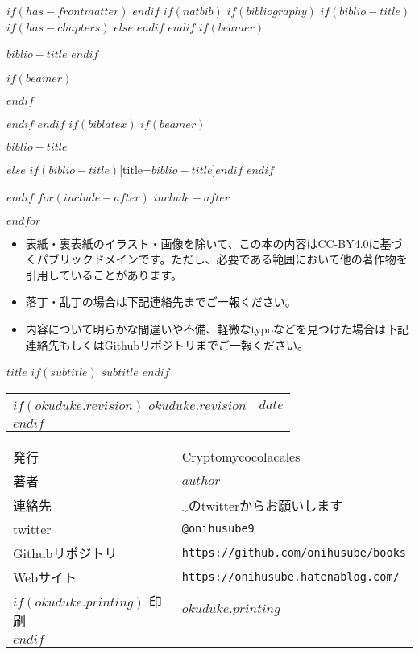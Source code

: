 $if(has-frontmatter)$
\backmatter
$endif$
$if(natbib)$
$if(bibliography)$
$if(biblio-title)$
$if(has-chapters)$
\renewcommand\bibname{$biblio-title$}
$else$
\renewcommand\refname{$biblio-title$}
$endif$
$endif$
$if(beamer)$
\begin{frame}[allowframebreaks]{$biblio-title$}
  \bibliographytrue
$endif$
  
$if(beamer)$
\end{frame}
$endif$

$endif$
$endif$
$if(biblatex)$
$if(beamer)$
\begin{frame}[allowframebreaks]{$biblio-title$}
  \bibliographytrue
  \printbibliography[heading=none]
\end{frame}
$else$
\printbibliography$if(biblio-title)$[title=$biblio-title$]$endif$
$endif$

$endif$
$for(include-after)$
$include-after$

$endfor$


\clearpage

\pagestyle{empty}

\begin{itemize}
  \item 表紙・裏表紙のイラスト・画像を除いて、この本の内容はCC-BY4.0に基づくパブリックドメインです。ただし、必要である範囲において他の著作物を引用していることがあります。
  \item 落丁・乱丁の場合は下記連絡先までご一報ください。
  \item 内容について明らかな間違いや不備、軽微なtypoなどを見つけた場合は下記連絡先もしくはGithubリポジトリまでご一報ください。
\end{itemize}


\begin{center}
\textsf{$title$}
$if(subtitle)$
$subtitle$
$endif$

\begin{tabular}{ll}
$if(okuduke.revision)$
$okuduke.revision$ & $date$ \\
$endif$
\end{tabular}

\begin{tabular}{ll} \toprule
  発行      & Cryptomycocolacales \\
  著者      & $author$ \\
  連絡先    & ↓のtwitterからお願いします \\
  twitter  & \verb|@onihusube9| \\
  Githubリポジトリ  & \verb|https://github.com/onihusube/books| \\
  Webサイト & \verb|https://onihusube.hatenablog.com/| \\
  $if(okuduke.printing)$
  印刷      & $okuduke.printing$  \\
  $endif$
\end{tabular}
\end{center}

